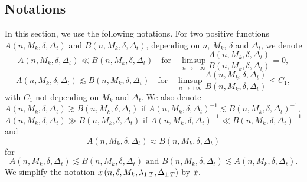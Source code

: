 \documentclass[twoside,11pt]{article}
\newcommand{\nb}{n}
\begin{document}
\subsection{Notations}
In this section, we use the following notations. For two  positive functions  $A(n,M_k,\delta,\Delta_t)$ and $B(n,M_k,\delta,\Delta_t)$, depending on $n$, $M_k$, $\delta$ and $\Delta_t$, we denote
$$A(n,M_k,\delta,\Delta_t)\ll B(n,M_k,\delta,\Delta_t) \quad \mbox{for}\quad \limsup_{n\to+\infty}\frac{A(n,M_k,\delta,\Delta_t)}{B(n,M_k,\delta,\Delta_t)}=0,$$
$$A(n,M_k,\delta,\Delta_t)\lesssim B(n,M_k,\delta,\Delta_t)  \quad \mbox{for}\quad\limsup_{n\to+\infty}\frac{A(n,M_k,\delta,\Delta_t)}{B(n,M_k,\delta,\Delta_t)}\leq C_1,$$
with $C_1$ not depending on $M_k$  and $\Delta_t$.
 We also denote
$A(n,M_k,\delta,\Delta_t)\gtrsim B(n,M_k,\delta,\Delta_t)$ if $A(n,M_k,\delta,\Delta_t)^{-1}\lesssim B(n,M_k,\delta,\Delta_t)^{-1}$, $A(n,M_k,\delta,\Delta_t)\gg B(n,M_k,\delta,\Delta_t)$ if $A(n,M_k,\delta,\Delta_t)^{-1}\ll B(n,M_k,\delta,\Delta_t)^{-1}$ and 
$$A(n,M_k,\delta,\Delta_t)\approx B(n,M_k,\delta,\Delta_t)$$ for $$A(n,M_k,\delta,\Delta_t)\lesssim B(n,M_k,\delta,\Delta_t) \mbox{ and } B(n,M_k,\delta,\Delta_t)\lesssim A(n,M_k,\delta,\Delta_t).$$
We simplify the notation $\Tilde{x}\left(\nb,\delta,M_k,\lambda_{1:T},\Delta_{1:T}\right)$ by $\Tilde{x}$.
\end{document}
